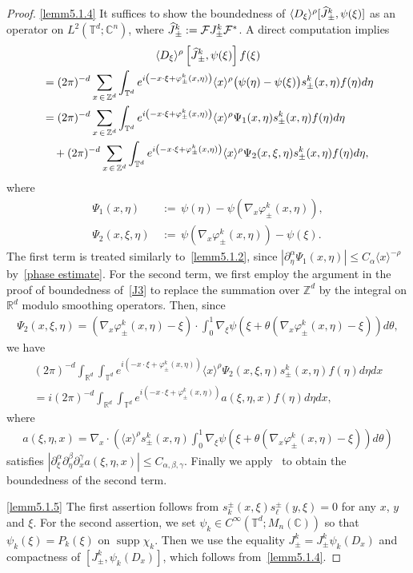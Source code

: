 \documentclass[10pt]{amsart}
\theoremstyle{definition}\newtheorem{defi}[theo]{Definition}\newtheorem{rema}[theo]{Remark}\newtheorem{exam}[theo]{Example}\newtheorem{exem}[theo]{Example}\newtheorem{nota}[theo]{Notation}
\renewcommand{\a}{\alpha}
\renewcommand{\b}{\beta}
\newcommand{\g}{\gamma}
\newcommand{\f}{\varphi}
\newcommand{\x}{\xi}
\newcommand{\y}{\eta}
\newcommand{\C}{\mathbb{C}}
\newcommand{\R}{\mathbb{R}}
\newcommand{\Z}{\mathbb{Z}}
\newcommand{\T}{\mathbb{T}}
\newcommand{\FS}{\mathcal{F}}
\newcommand{\la}{\langle}
\newcommand{\ra}{\rangle}
\newcommand{\jap}[1]{\langle #1 \rangle}
\DeclareMathOperator{\supp}{supp}
\let\oldhat\hat
\renewcommand*{\hat}[1]{\mathchoice{\widehat{#1}}{\widehat{#1}}{\oldhat{#1}}{\oldhat{#1}}}
\begin{document}
\begin{proof}
\eqref{lemm5.1.4} It suffices to show the boundedness of $\jap{D_\x}^\rho [\hat{J}_\pm^k, \psi(\x)]$ as an operator on $L^2(\T^d;\C^n)$, where $\hat{J}_\pm^k:=\FS J_\pm^k\FS^*$. A direct computation implies
\begin{multline*}
\la D_\x \ra^\rho \left[\hat{J}_\pm^k, \psi(\x)\right]f(\x) \\
\begin{aligned}
&= (2\pi)^{-d} \sum_{x\,\in\,\Z^d}\int_{\T^d} e^{i\left(-x\cdot\x+\f_\pm^k(x,\y)\right)} \jap{x}^\rho \bigl(\psi(\y)-\psi(\x)\bigr) s_\pm^k(x,\y) f(\y) d\y \\
&= (2\pi)^{-d} \sum_{x\,\in\,\Z^d}\int_{\T^d} e^{i\left(-x\cdot\x+\f_\pm^k(x,\y)\right)} \jap{x}^\rho \Psi_1(x,\y) s_\pm^k(x,\y) f(\y) d\y  \\
&\quad + (2\pi)^{-d} \sum_{x\,\in\,\Z^d}\int_{\T^d} e^{i\left(-x\cdot\x+\f_\pm^k(x,\y)\right)} \jap{x}^\rho \Psi_2(x,\x,\y) s_\pm^k(x,\y) f(\y) d\y, 
\end{aligned}
\end{multline*}
where
\begin{align*}
\Psi_1(x,\y)\, &{:=}\,  \psi(\y)-\psi\left(\nabla_x\f_\pm^k(x,\y)\right), \\
\Psi_2(x,\x,\y)\, &{:=}\,  \psi\left(\nabla_x\f_\pm^k(x,\y)\right)-\psi(\x).
\end{align*}
The first term is treated similarly to~\eqref{lemm5.1.2}, since $|\partial_\y^\a \Psi_1(x,\y)| \leq C_\a \jap{x}^{-\rho}$ by~\eqref{phase estimate}. For the second term, we first employ the argument in the proof of boundedness of~\eqref{J3} to replace the summation over $\Z^d$ by the integral on $\R^d$ modulo smoothing operators. Then, since
\begin{align*}
\Psi_2(x,\x,\y) = \left(\nabla_x\f_\pm^k(x,\y)-\x\right)\cdot\int_0^1 \nabla_\x \psi\left(\x+\theta\left(\nabla_x\f_\pm^k(x,\y)-\x\right)\right) d\theta,
\end{align*}
we have
\begin{multline*}
(2\pi)^{-d} \int_{\R^d}\int_{\T^d} e^{i\left(-x\cdot\x+\f_\pm^k(x,\y)\right)} \jap{x}^\rho \Psi_2(x,\x,\y) s_\pm^k(x,\y) f(\eta) d\eta dx \\
= i(2\pi)^{-d} \int_{\R^d}\int_{\T^d} e^{i\left(-x\cdot\x+\f_\pm^k(x,\y)\right)} a(\x,\y,x) f(\y) d\y dx,
\end{multline*}
where
\begin{align*}
a(\x,\y,x)=\nabla_x \cdot \left(\jap{x}^\rho s_\pm^k(x,\y) \int_0^1 \nabla_\x\psi\left(\x+\theta\left(\nabla_x\f_\pm^k(x,\y)-\x\right)\right) d\theta \right)
\end{align*}
satisfies $|\partial_\x^\a\partial_\y^\b\partial_x^\g a(\x,\y,x)|\leq C_{\a,\b,\g}$. Finally we apply~\cite[Theorem~2.1]{As-F} to obtain the boundedness of the second term.

\eqref{lemm5.1.5} The first assertion follows from $s_k^\pm(x,\x)s_\ell^\pm(y,\x)=0$ for any $x$, $y$ and $\x$. For the second assertion, we set $\psi_k\in C^\infty(\T^d;M_n(\C))$ so that $\psi_k(\x)=P_k(\x)$ on $\supp \chi_k$. Then we use the equality $J_\pm^k=J_\pm^k \psi_k(D_x)$ and compactness of $[J_\pm^k,\psi_k(D_x)]$, which follows from~\eqref{lemm5.1.4}.
\end{proof}
\end{document}
